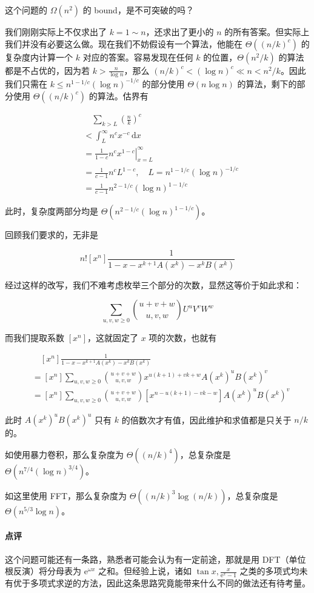 \documentclass[12pt]{ctexart}
\theoremstyle{theorem}
\theoremstyle{theorem}
\begin{document}
这个问题的 $\Omega(n^2)$ 的 bound，是不可突破的吗？

我们刚刚实际上不仅求出了 $k=1\sim n$，还求出了更小的 $n$ 的所有答案。但实际上我们并没有必要这么做。现在我们不妨假设有一个算法，他能在 $\Theta((n/k)^c)$ 的复杂度内计算一个 $k$ 对应的答案。容易发现在任何 $k$ 的位置，$\Theta(n^2/k)$ 的算法都是不占优的，因为若 $k>\frac n{\log n}$，那么 $(n/k)^c < (\log n)^c \ll n < n^2/k$。因此我们只需在 $k\le n^{1-1/c}(\log n)^{-1/c}$ 的部分使用 $\Theta(n\log n)$ 的算法，剩下的部分使用 $\Theta((n/k)^c)$ 的算法。估界有

$$
\begin{aligned}
&\quad \sum_{k>L} \left(\frac nk\right)^c\\
&< \int_L^\infty n^cx^{-c} \,\mathrm dx\\
&= \left.\frac 1{1-c}n^c x^{1-c}\right|_{x=L}^\infty\\
&= \frac 1{c-1}n^cL^{1-c},\quad L=n^{1-1/c}(\log n)^{-1/c}\\
&= \frac 1{c-1} n^{2-1/c}(\log n)^{1-1/c}
\end{aligned}
$$

此时，复杂度两部分均是 $\Theta(n^{2-1/c}(\log n)^{1-1/c})$。

回顾我们要求的，无非是

$$
n![x^n] \frac 1{1-x-x^{k+1}A(x^k)-x^kB(x^k)}
$$

经过这样的改写，我们不难考虑枚举三个部分的次数，显然这等价于如此求和：

$$
\sum_{u,v,w\ge 0} \binom{u+v+w}{u,v,w} U^uV^vW^w 
$$

而我们提取系数 $[x^n]$，这就固定了 $x$ 项的次数，也就有

$$
\begin{aligned}
&\quad [x^n] \frac 1{1-x-x^{k+1}A(x^k)-x^kB(x^k)}\\
&= [x^n]\sum_{u,v,w\ge 0} \binom{u+v+w}{u,v,w}x^{u(k+1)+vk+w}A(x^k)^uB(x^k)^v\\
&= [x^n]\sum_{u,v,w\ge 0} \binom{u+v+w}{u,v,w} [x^{n-u(k+1)-vk-w}] A(x^k)^uB(x^k)^v
\end{aligned}
$$

此时 $A(x^k)^uB(x^k)^u$ 只有 $k$ 的倍数次才有值，因此维护和求值都是只关于 $n/k$ 的。

如使用暴力卷积，那么复杂度为 $\Theta((n/k)^4)$，总复杂度是 $\Theta(n^{7/4}(\log n)^{3/4})$。

如这里使用 FFT，那么复杂度为 $\Theta((n/k)^3\log (n/k))$，总复杂度是 $\Theta(n^{5/3}\log n)$。

\paragraph{点评} 这个问题可能还有一条路，熟悉者可能会认为有一定前途，那就是用 DFT（单位根反演）将分母表为 $\mathrm{e}^{\omega x}$ 之和。但经验上说，诸如 $\tan x, \frac x{\mathrm e^x-1}$ 之类的多项式均未有优于多项式求逆的方法，因此这条思路究竟能带来什么不同的做法还有待考量。
\end{document}
